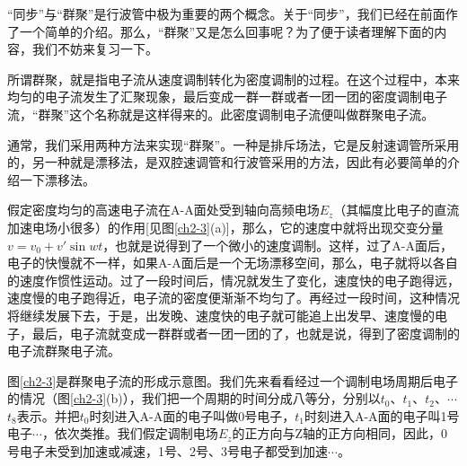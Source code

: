 “同步”与“群聚”是行波管中极为重要的两个概念。关于“同步”，我们已经在前面作了一个简单的介绍。那么，“群聚”又是怎么回事呢？为了便于读者理解下面的内容，我们不妨来复习一下。

所谓群聚，就是指电子流从速度调制转化为密度调制的过程。在这个过程中，本来均匀的电子流发生了汇聚现象，最后变成一群一群或者一团一团的密度调制电子流，“群聚”这个名称就是这样得来的。此密度调制电子流便叫做群聚电子流。

通常，我们采用两种方法来实现“群聚”。一种是排斥场法，它是反射速调管所采用的，另一种就是漂移法，是双腔速调管和行波管采用的方法，因此有必要简单的介绍一下漂移法。

假定密度均匀的高速电子流在A-A面处受到轴向高频电场$ E_z$（其幅度比电子的直流加速电场小很多）的作用[见图\ref{ch2-3}(a)]，那么，它的速度中就将出现交变分量$ v=v_0 +v'\sin{wt} $，也就是说得到了一个微小的速度调制。这样，过了A-A面后，电子的快慢就不一样，如果A-A面后是一个无场漂移空间，那么，电子就将以各自的速度作惯性运动。过了一段时间后，情况就发生了变化，速度快的电子跑得远，速度慢的电子跑得近，电子流的密度便渐渐不均匀了。再经过一段时间，这种情况将继续发展下去，于是，出发晚、速度快的电子就可能追上出发早、速度慢的电子，最后，电子流就变成一群群或者一团一团的了，也就是说，得到了密度调制的电子流群聚电子流。

图\ref{ch2-3}是群聚电子流的形成示意图。我们先来看看经过一个调制电场周期后电子的情况（图\ref{ch2-3}(b)），我们把一个周期的时间分成八等分，分别以$t_0$、$ t_1 $、$ t_2 $、$ \cdots $ $ t_8 $表示。并把$ t_0 $时刻进入A-A面的电子叫做0号电子，$ t_1 $时刻进入A-A面的电子叫1号电子$ \cdots $，依次类推。我们假定调制电场$ E_z $的正方向与Z轴的正方向相同，因此，0号电子未受到加速或减速，1号、2号、3号电子都受到加速$ \cdots $。

